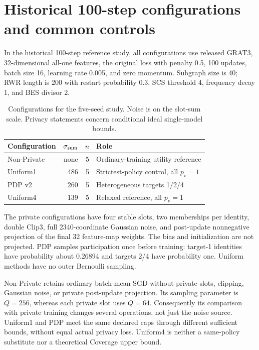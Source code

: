 \section{Historical 100-step configurations and common controls}
In the historical 100-step reference study, all configurations use released GRAT3, 32-dimensional all-one features, the original loss with penalty 0.5, 100 updates, batch size 16, learning rate 0.005, and zero momentum. Subgraph size is 40; RWR length is 200 with restart probability 0.3, SCS threshold 4, frequency decay 1, and BES divisor 2.

\begin{table}[htbp]
\centering\small
\caption{Configurations for the five-seed study. Noise is on the slot-sum scale. Privacy statements concern conditional ideal single-model bounds.}\label{tab:config}
\begin{tabular}{lrrp{64mm}}\toprule
Configuration & $\sigma_{\rm sum}$ & $n$ & Role\\\midrule
Non-Private & none & 5 & Ordinary-training utility reference\\
Uniform1 & 486 & 5 & Strictest-policy control, all $p_v=1$\\
PDP v2 & 260 & 5 & Heterogeneous targets 1/2/4\\
Uniform4 & 139 & 5 & Relaxed reference, all $p_v=1$\\\bottomrule
\end{tabular}
\end{table}

The private configurations have four stable slots, two memberships per identity, double Clip3, full 2340-coordinate Gaussian noise, and post-update nonnegative projection of the final 32 feature-map weights. The bias and initialization are not projected. PDP samples participation once before training: target-1 identities have probability about 0.26894 and targets 2/4 have probability one. Uniform methods have no outer Bernoulli sampling.

Non-Private retains ordinary batch-mean SGD without private slots, clipping, Gaussian noise, or private post-update projection. Its sampling parameter is $Q=256$, whereas each private slot uses $Q=64$. Consequently its comparison with private training changes several operations, not just the noise source. Uniform1 and PDP meet the same declared caps through different sufficient bounds, without equal actual privacy loss. Uniform4 is neither a same-policy substitute nor a theoretical Coverage upper bound.

